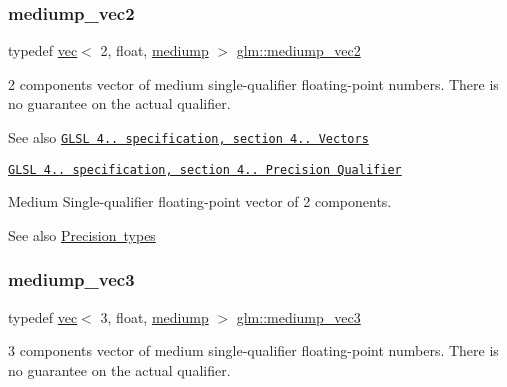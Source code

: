 \subsubsection{\texorpdfstring{mediump\+\_\+vec2}{mediump\_vec2}}
{\footnotesize\ttfamily typedef \mbox{\hyperlink{structglm_1_1vec}{vec}}$<$ 2, float, \mbox{\hyperlink{namespaceglm_a36ed105b07c7746804d7fdc7cc90ff25a6416f3ea0c9025fb21ed50c4d6620482}{mediump}} $>$ \mbox{\hyperlink{group__core__precision_ga96e0011dd4d124d28fd52ef2f0c6f299}{glm\+::mediump\+\_\+vec2}}}

2 components vector of medium single-\/qualifier floating-\/point numbers. There is no guarantee on the actual qualifier.

\begin{DoxySeeAlso}{See also}
\href{http://www.opengl.org/registry/doc/GLSLangSpec.4.20.8.pdf}{\tt G\+L\+SL 4.. specification, section 4.. Vectors} 

\href{http://www.opengl.org/registry/doc/GLSLangSpec.4.20.8.pdf}{\tt G\+L\+SL 4.. specification, section 4.. Precision Qualifier}
\end{DoxySeeAlso}
Medium Single-\/qualifier floating-\/point vector of 2 components. \begin{DoxySeeAlso}{See also}
\mbox{\hyperlink{group__core__precision}{Precision types}} 
\end{DoxySeeAlso}
\mbox{\label{group__core__precision_ga709e6ab33a5deb4a42ce9fcde75655f3}} 
\subsubsection{\texorpdfstring{mediump\+\_\+vec3}{mediump\_vec3}}
{\footnotesize\ttfamily typedef \mbox{\hyperlink{structglm_1_1vec}{vec}}$<$ 3, float, \mbox{\hyperlink{namespaceglm_a36ed105b07c7746804d7fdc7cc90ff25a6416f3ea0c9025fb21ed50c4d6620482}{mediump}} $>$ \mbox{\hyperlink{group__core__precision_ga709e6ab33a5deb4a42ce9fcde75655f3}{glm\+::mediump\+\_\+vec3}}}

3 components vector of medium single-\/qualifier floating-\/point numbers. There is no guarantee on the actual qualifier.

